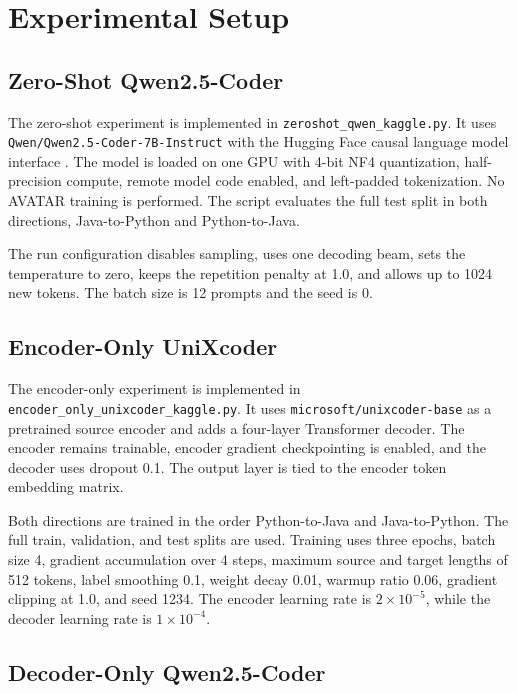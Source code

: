 \chapter{Experimental Setup}

\section{Zero-Shot Qwen2.5-Coder}

\quad The zero-shot experiment is implemented in
\texttt{zeroshot\_qwen\_kaggle.py}. It uses
\texttt{Qwen/}\allowbreak\texttt{Qwen2.5-Coder-7B-Instruct} with the Hugging
Face causal language model interface \cite{wolf2020transformers}. The model is
loaded on one GPU with 4-bit NF4 quantization, half-precision compute, remote
model code enabled, and left-padded tokenization. No AVATAR training is
performed. The script evaluates the full test split in both directions,
Java-to-Python and Python-to-Java.

The run configuration disables sampling, uses one decoding beam, sets the
temperature to zero, keeps the repetition penalty at 1.0, and allows up to 1024
new tokens. The batch size is 12 prompts and the seed is 0.

\section{Encoder-Only UniXcoder}

\quad The encoder-only experiment is implemented in
\texttt{encoder\_only\_unixcoder\_kaggle.py}. It uses
\texttt{microsoft/}\allowbreak\texttt{unixcoder-base} \cite{guo2022unixcoder}
as a pretrained source encoder and adds a four-layer Transformer decoder. The
encoder remains trainable, encoder gradient checkpointing is enabled, and the
decoder uses dropout 0.1. The output layer is tied to the encoder token
embedding matrix.

Both directions are trained in the order Python-to-Java and Java-to-Python.
The full train, validation, and test splits are used. Training uses three
epochs, batch size 4, gradient accumulation over 4 steps, maximum source and
target lengths of 512 tokens, label smoothing 0.1, weight decay 0.01, warmup
ratio 0.06, gradient clipping at 1.0, and seed 1234. The encoder learning rate
is \(2 \times 10^{-5}\), while the decoder learning rate is \(1 \times
10^{-4}\).

\section{Decoder-Only Qwen2.5-Coder}

